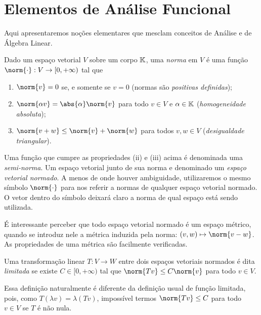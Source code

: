 
\section{Elementos de Análise Funcional}
\label{app: func anal}

Aqui apresentaremos noções elementares que mesclam conceitos de Análise e de Álgebra Linear.

\begin{defn}
    Dado um espaço vetorial \( V \) sobre um corpo \( \mathbb{K} \), uma \emph{norma} em \( V \) é uma função \( \norm{ \cdot } : V \to [0, +\infty) \) tal que
    \begin{enumerate}[label=(\roman*)]
        \item \( \norm{ v } = 0 \) se, e somente se \( v = 0 \) (normas são \emph{positivas definidas});
        \item \( \norm{ \alpha v } = \abs{ \alpha } \norm{ v } \) para todo \( v \in V \) e \( \alpha \in \mathbb{K} \) (\emph{homogeneidade absoluta});
        \item \( \norm{ v + w } \leq \norm{ v } + \norm{ w } \) para todos \( v, w \in V \) (\emph{desigualdade triangular}).
    \end{enumerate}
\end{defn}
Uma função que cumpre as propriedades (ii) e (iii) acima é denominada uma \emph{semi-norma}.
Um espaço vetorial junto de sua norma e denominado um \emph{espaço vetorial normado}.
A menos de onde houver ambiguidade, utilizaremos o mesmo símbolo \( \norm{ \cdot } \) para nos referir a normas de qualquer espaço vetorial normado.
O vetor dentro do símbolo deixará claro a norma de qual espaço está sendo utilizada.

É interessante perceber que todo espaço vetorial normado é um espaço métrico, quando se introduz nele a métrica induzida pela norma: \( (v, w) \mapsto \norm{ v - w } \).
As propriedades de uma métrica são facilmente verificadas.

\begin{defn}
    Uma transformação linear \( T : V \to W \) entre dois espaços vetoriais normados é dita \emph{limitada} se existe \( C \in [0, +\infty) \) tal que \( \norm{ Tv } \leq C \norm{ v } \) para todo \( v \in V \).
\end{defn}
Essa definição naturalmente é diferente da definição usual de função limitada, pois, como \( T(\lambda v) = \lambda (Tv) \), impossível termos \( \norm{ Tv } \leq C \) para todo \( v \in V \) se \( T \) é não nula.

